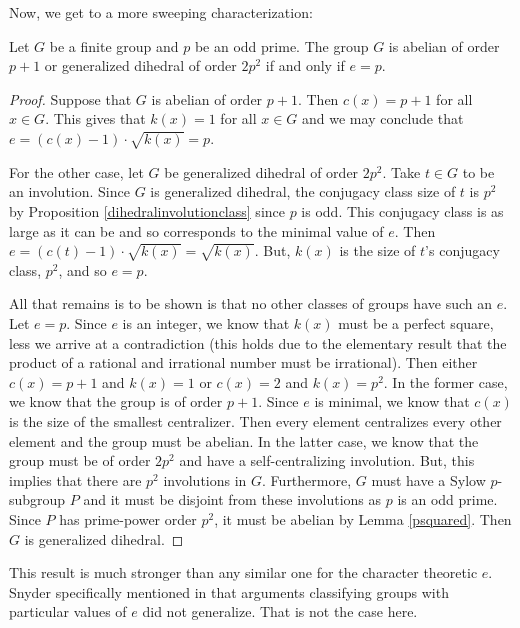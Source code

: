 \documentclass[main.tex]{subfiles}
\begin{document}
Now, we get to a more sweeping characterization:

\begin{theorem}
Let $G$ be a finite group and $p$ be an odd prime. The group $G$ is abelian of order $p+1$ or generalized dihedral of order $2p^2$ if and only if $e = p$.
\end{theorem}

\begin{proof}
Suppose that $G$ is abelian of order $p+1$. Then $c(x) = p+1$ for all $x \in G$. This gives that $k(x) = 1$ for all $x \in G$ and we may conclude that $e = (c(x) - 1) \cdot \sqrt{k(x)} = p$.

For the other case, let $G$ be generalized dihedral of order $2p^2$. Take $t \in G$ to be an involution. Since $G$ is generalized dihedral, the conjugacy class size of $t$ is $p^2$ by Proposition \ref{dihedralinvolutionclass} since $p$ is odd. This conjugacy class is as large as it can be and so corresponds to the minimal value of $e$. Then $e = (c(t) - 1) \cdot \sqrt{k(x)} = \sqrt{k(x)}$. But, $k(x)$ is the size of $t$'s conjugacy class, $p^2$, and so $e = p$.

All that remains is to be shown is that no other classes of groups have such an $e$. Let $e = p$. Since $e$ is an integer, we know that $k(x)$ must be a perfect square, less we arrive at a contradiction (this holds due to the elementary result that the product of a rational and irrational number must be irrational). Then either $c(x) = p+1$ and $k(x) = 1$ or $c(x) = 2$ and $k(x) = p^2$. In the former case, we know that the group is of order $p+1$. Since $e$ is minimal, we know that $c(x)$ is the size of the smallest centralizer. Then every element centralizes every other element and the group must be abelian. In the latter case, we know that the group must be of order $2p^2$ and have a self-centralizing involution. But, this implies that there are $p^2$ involutions in $G$. Furthermore, $G$ must have a Sylow $p$-subgroup $P$ and it must be disjoint from these involutions as $p$ is an odd prime. Since $P$ has prime-power order $p^2$, it must be abelian by Lemma \ref{psquared}. Then $G$ is generalized dihedral.
\end{proof}

This result is much stronger than any similar one for the character theoretic $e$. Snyder specifically mentioned in \cite{snyderarticle} that arguments classifying groups with particular values of $e$ did not generalize. That is not the case here.

\hss
\end{document}
